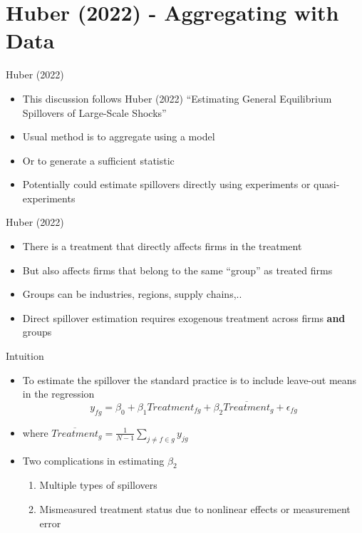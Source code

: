 \documentclass[english,xcolor=svgnames]{beamer}
\begin{document}
\section{Huber (2022) - Aggregating with Data}

\begin{frame}{Huber (2022)}
\begin{itemize}
\item This discussion follows Huber (2022) ``Estimating General Equilibrium Spillovers of Large-Scale Shocks''
\item Usual method is to aggregate using a model
\item Or to generate a sufficient statistic
\item Potentially could estimate spillovers directly using experiments or quasi-experiments
\end{itemize}
\end{frame}

\begin{frame}{Huber (2022)}
\begin{itemize}
\item There is a treatment that directly affects firms in the treatment
\item But also affects firms that belong to the same ``group'' as treated firms
\item Groups can be industries, regions, supply chains,..
\item Direct spillover estimation requires exogenous treatment across firms \textbf{and} groups
\end{itemize}
\end{frame}

\begin{frame}{Intuition}
\begin{itemize}
\item To estimate the spillover the standard practice is to include leave-out means in the regression
$$y_{fg} = \beta_0 + \beta_1 Treatment_{fg} + \beta_2 \overline{Treatment}_g + \epsilon_{fg}$$
\item where $\overline{Treatment}_g = \frac{1}{N-1} \sum_{j \neq f \in g} y_{jg}$
\item Two complications in estimating $\beta_2$
\begin{enumerate}
\item Multiple types of spillovers
\item Mismeasured treatment status due to nonlinear effects or measurement error
\end{enumerate}
\end{itemize}
\end{frame}
\end{document}
